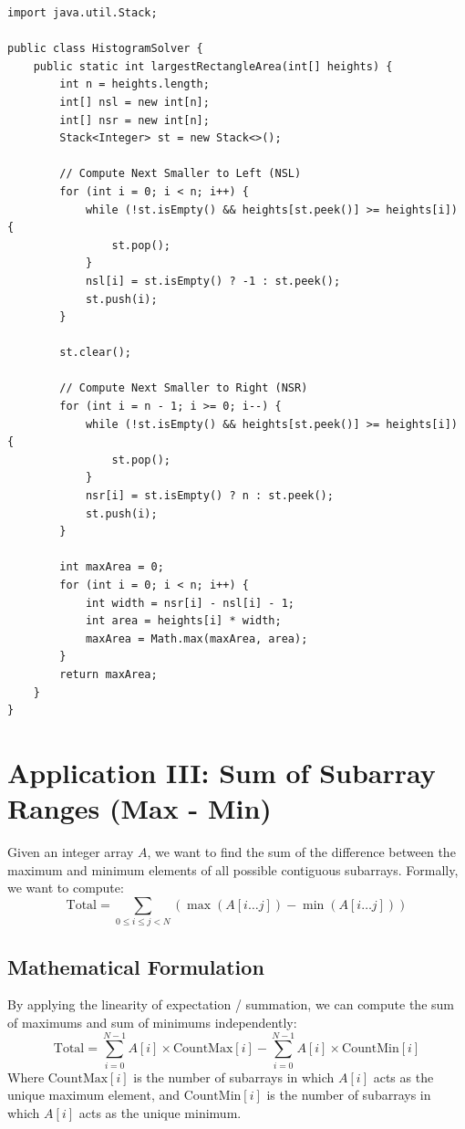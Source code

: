 \documentclass[10pt,journal,compsoc,onecolumn]{IEEEtran}
\begin{document}
\begin{verbatim}
import java.util.Stack;

public class HistogramSolver {
    public static int largestRectangleArea(int[] heights) {
        int n = heights.length;
        int[] nsl = new int[n];
        int[] nsr = new int[n];
        Stack<Integer> st = new Stack<>();

        // Compute Next Smaller to Left (NSL)
        for (int i = 0; i < n; i++) {
            while (!st.isEmpty() && heights[st.peek()] >= heights[i]) {
                st.pop();
            }
            nsl[i] = st.isEmpty() ? -1 : st.peek();
            st.push(i);
        }

        st.clear();

        // Compute Next Smaller to Right (NSR)
        for (int i = n - 1; i >= 0; i--) {
            while (!st.isEmpty() && heights[st.peek()] >= heights[i]) {
                st.pop();
            }
            nsr[i] = st.isEmpty() ? n : st.peek();
            st.push(i);
        }

        int maxArea = 0;
        for (int i = 0; i < n; i++) {
            int width = nsr[i] - nsl[i] - 1;
            int area = heights[i] * width;
            maxArea = Math.max(maxArea, area);
        }
        return maxArea;
    }
}
\end{verbatim}

\section{Application III: Sum of Subarray Ranges (Max - Min)}
\label{sec:subarray_ranges}
Given an integer array $A$, we want to find the sum of the difference between the maximum and minimum elements of all possible contiguous subarrays.
Formally, we want to compute:
\begin{equation}
\text{Total} = \sum_{0 \le i \le j < N} (\max(A[i \ldots j]) - \min(A[i \ldots j]))
\end{equation}

\subsection{Mathematical Formulation}
By applying the linearity of expectation / summation, we can compute the sum of maximums and sum of minimums independently:
\begin{equation}
\text{Total} = \sum_{i=0}^{N-1} A[i] \times \text{CountMax}[i] - \sum_{i=0}^{N-1} A[i] \times \text{CountMin}[i]
\end{equation}
Where $\text{CountMax}[i]$ is the number of subarrays in which $A[i]$ acts as the unique maximum element, and $\text{CountMin}[i]$ is the number of subarrays in which $A[i]$ acts as the unique minimum.
\end{document}
